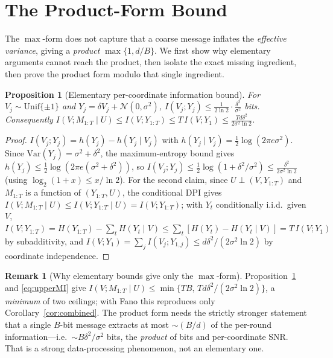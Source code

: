 \documentclass[11pt]{article}
\newtheorem{proposition}{Proposition}
\theoremstyle{definition}
\newtheorem{remark}{Remark}
\newcommand{\Unif}{\mathrm{Unif}}
\newcommand{\Ncal}{\mathcal{N}}
\begin{document}
\section{The Product-Form Bound}
\label{sec:product}

The $\max$-form does not capture that a coarse message inflates the \emph{effective variance}, giving a
\emph{product} $\max\{1,d/B\}$. We first show why elementary arguments cannot reach the product, then
isolate the exact missing ingredient, then prove the product form modulo that single ingredient.

\begin{proposition}[Elementary per-coordinate information bound]
\label{prop:elem}
For $V_j\sim\Unif\{\pm1\}$ and $Y_j=\delta V_j+\Ncal(0,\sigma^2)$, $I(V_j;Y_j)\le\frac{1}{2\ln2}\cdot\frac{\delta^2}{\sigma^2}$
bits. Consequently $I(V;M_{1:T}\mid U)\le I(V;Y_{1:T})\le T\,I(V;Y_1)\le\frac{T d\delta^2}{2\sigma^2\ln2}$.
\end{proposition}

\begin{proof}
$I(V_j;Y_j)=h(Y_j)-h(Y_j\mid V_j)$ with $h(Y_j\mid V_j)=\tfrac12\log(2\pi e\sigma^2)$. Since
$\mathrm{Var}(Y_j)=\sigma^2+\delta^2$, the maximum-entropy bound gives $h(Y_j)\le\tfrac12\log(2\pi e(\sigma^2+\delta^2))$,
so $I(V_j;Y_j)\le\tfrac12\log(1+\delta^2/\sigma^2)\le\frac{\delta^2}{2\sigma^2\ln2}$ (using $\log_2(1+x)\le x/\ln2$).
For the second claim, since $U\perp(V,Y_{1:T})$ and $M_{1:T}$ is a function of $(Y_{1:T},U)$, the conditional
DPI gives $I(V;M_{1:T}\mid U)\le I(V;Y_{1:T}\mid U)=I(V;Y_{1:T})$; with $Y_t$ conditionally i.i.d.\ given $V$,
$I(V;Y_{1:T})=H(Y_{1:T})-\sum_t H(Y_t\mid V)\le\sum_t[H(Y_t)-H(Y_t\mid V)]=T\,I(V;Y_1)$ by subadditivity,
and $I(V;Y_1)=\sum_j I(V_j;Y_{1,j})\le d\delta^2/(2\sigma^2\ln2)$ by coordinate independence.
\end{proof}

\begin{remark}[Why elementary bounds give only the $\max$-form]
Proposition~\ref{prop:elem} and \eqref{eq:upperMI} give $I(V;M_{1:T}\mid U)\le\min\{TB,\,Td\delta^2/(2\sigma^2\ln2)\}$,
a \emph{minimum} of two ceilings; with Fano this reproduces only Corollary~\ref{cor:combined}. The
product form needs the strictly stronger statement that a single $B$-bit message extracts at most
$\sim(B/d)$ of the per-round information---i.e.\ $\sim B\delta^2/\sigma^2$ bits, the \emph{product} of
bits and per-coordinate SNR. That is a strong data-processing phenomenon, not an elementary one.
\end{remark}
\end{document}
